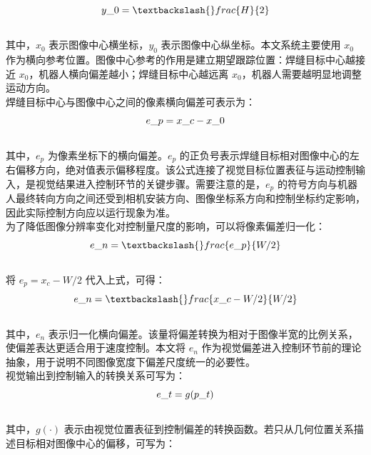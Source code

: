 \documentclass[UTF8,a4paper,12pt]{ctexrep}
\begin{document}
$$\\
y\_0 = \textbackslash\{\}frac\{H\}\{2\}\\
$$\\

其中，$x_0$ 表示图像中心横坐标，$y_0$ 表示图像中心纵坐标。本文系统主要使用 $x_0$ 作为横向参考位置。图像中心参考的作用是建立期望跟踪位置：焊缝目标中心越接近 $x_0$，机器人横向偏差越小；焊缝目标中心越远离 $x_0$，机器人需要越明显地调整运动方向。\\

焊缝目标中心与图像中心之间的像素横向偏差可表示为：\\

$$\\
e\_p = x\_c - x\_0\\
$$\\

其中，$e_p$ 为像素坐标下的横向偏差。$e_p$ 的正负号表示焊缝目标相对图像中心的左右偏移方向，绝对值表示偏移程度。该公式连接了视觉目标位置表征与运动控制输入，是视觉结果进入控制环节的关键步骤。需要注意的是，$e_p$ 的符号方向与机器人最终转向方向之间还受到相机安装方向、图像坐标系方向和控制坐标约定影响，因此实际控制方向应以运行现象为准。\\

为了降低图像分辨率变化对控制量尺度的影响，可以将像素偏差归一化：\\

$$\\
e\_n = \textbackslash\{\}frac\{e\_p\}\{W/2\}\\
$$\\

将 $e_p=x_c-W/2$ 代入上式，可得：\\

$$\\
e\_n = \textbackslash\{\}frac\{x\_c-W/2\}\{W/2\}\\
$$\\

其中，$e_n$ 表示归一化横向偏差。该量将偏差转换为相对于图像半宽的比例关系，使偏差表达更适合用于速度控制。本文将 $e_n$ 作为视觉偏差进入控制环节前的理论抽象，用于说明不同图像宽度下偏差尺度统一的必要性。\\

视觉输出到控制输入的转换关系可写为：\\

$$\\
e\_t = g(p\_t)\\
$$\\

其中，$g(\cdot)$ 表示由视觉位置表征到控制偏差的转换函数。若只从几何位置关系描述目标相对图像中心的偏移，可写为：\\
\end{document}
